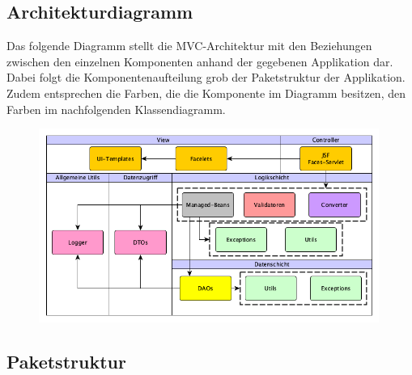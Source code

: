 \documentclass{article}
\begin{document}
\subsection{Architekturdiagramm}

Das folgende Diagramm stellt die MVC-Architektur mit den Beziehungen zwischen den einzelnen Komponenten anhand der gegebenen Applikation dar. Dabei folgt die Komponentenaufteilung grob der Paketstruktur der Applikation. Zudem entsprechen die Farben, die die Komponente im Diagramm besitzen, den Farben im nachfolgenden Klassendiagramm.

\begin{figure}[H]
	\centering
	\includegraphics[width = 30em]{Modeldiagramm}
\end{figure}



\subsection{Paketstruktur}
\end{document}
